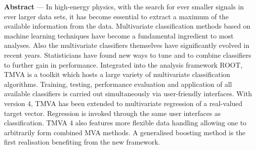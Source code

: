 \vfill

\thispagestyle{empty}
\newpage



\def\UrlFont{\sf}
{\small\sf
{\sf\bfseries Abstract} --- 
In high-energy physics, with the search for ever smaller signals in
ever larger data sets, it has become essential to extract a maximum of
the available information from the data.  Multivariate classification
methods based on machine learning techniques have become a fundamental
ingredient to most analyses.  Also the multivariate classifiers
themselves have significantly evolved in recent years. Statisticians
have found new ways to tune and to combine classifiers to further gain
in performance. Integrated into the analysis framework ROOT, TMVA is
a toolkit which hosts a large variety of multivariate classification
algorithms. Training, testing, performance evaluation and application of 
all available classifiers is carried out simultaneously via user-friendly 
interfaces. With version 4, TMVA has been extended to multivariate 
regression of a real-valued target vector. Regression is invoked through 
the same user interfaces as classification. TMVA 4 also features 
more flexible data handling allowing one to arbitrarily form 
combined MVA methods. A generalised boosting method is the first 
realisation benefiting from the new framework.
}
\vspace{0.5cm}
